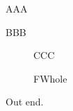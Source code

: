 \documentclass{article}
\begin{document}
\begin{table}
\begin{minipage}{.4\textwidth}AAA\end{minipage}
\begin{minipage}{.4\textwidth}BBB\end{minipage}
\caption{Whole}
\end{table}
\begin{figure}
\begin{minipage}{.4\textwidth}CCC\end{minipage}
\caption{FWhole}
\end{figure}
Out  end.
\end{document}
